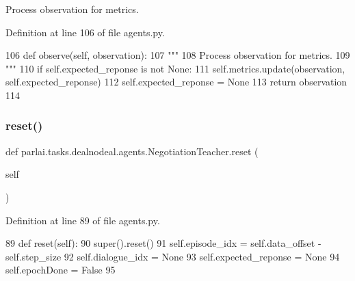 \begin{DoxyVerb}Process observation for metrics.
\end{DoxyVerb}
 

Definition at line 106 of file agents.\+py.


\begin{DoxyCode}
106     \textcolor{keyword}{def }observe(self, observation):
107         \textcolor{stringliteral}{"""}
108 \textcolor{stringliteral}{        Process observation for metrics.}
109 \textcolor{stringliteral}{        """}
110         \textcolor{keywordflow}{if} self.expected\_reponse \textcolor{keywordflow}{is} \textcolor{keywordflow}{not} \textcolor{keywordtype}{None}:
111             self.metrics.update(observation, self.expected\_reponse)
112             self.expected\_reponse = \textcolor{keywordtype}{None}
113         \textcolor{keywordflow}{return} observation
114 
\end{DoxyCode}
\mbox{\label{classparlai_1_1tasks_1_1dealnodeal_1_1agents_1_1NegotiationTeacher_a20b0ed1425ed8b1c6bc179220b766b19}} 
\subsubsection{\texorpdfstring{reset()}{reset()}}
{\footnotesize\ttfamily def parlai.\+tasks.\+dealnodeal.\+agents.\+Negotiation\+Teacher.\+reset (\begin{DoxyParamCaption}\item[{}]{self }\end{DoxyParamCaption})}



Definition at line 89 of file agents.\+py.


\begin{DoxyCode}
89     \textcolor{keyword}{def }reset(self):
90         super().reset()
91         self.episode\_idx = self.data\_offset - self.step\_size
92         self.dialogue\_idx = \textcolor{keywordtype}{None}
93         self.expected\_reponse = \textcolor{keywordtype}{None}
94         self.epochDone = \textcolor{keyword}{False}
95 
\end{DoxyCode}
\mbox{\label{classparlai_1_1tasks_1_1dealnodeal_1_1agents_1_1NegotiationTeacher_a915e9437d2b0dc50973b3eea1711108b}} 
